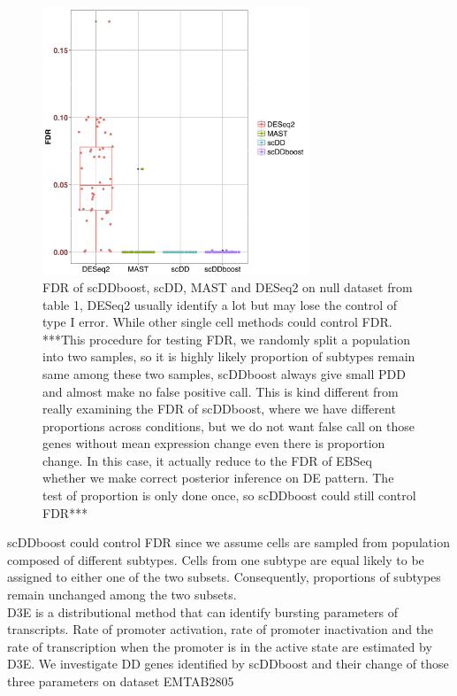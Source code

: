 \documentclass[11pt]{amsart}
\begin{document}
\begin{figure}[h]
\includegraphics[width = 8cm]{FDR.png}
 \caption{FDR of scDDboost, scDD, MAST and DESeq2 on null dataset from table 1, DESeq2 usually identify a lot but may lose the control of type I error. While other single cell methods could control FDR. ***This procedure for testing FDR,  we randomly split a population into two samples, so it is highly likely proportion of subtypes remain same among these two samples, scDDboost always give small PDD and almost make no false positive call. This is kind different from really examining the FDR of scDDboost, where we have different proportions across conditions, but we do not want false call on those genes without mean expression change even there is proportion change. In this case, it actually reduce to the FDR of EBSeq whether we make correct posterior inference on DE pattern. The test of proportion is only done once, so scDDboost could still control FDR*** }
  \label{fig:7}
\end{figure}
scDDboost could control FDR since we assume cells are sampled from population composed of different subtypes. Cells from one subtype are equal likely to be assigned to either one of the two subsets. Consequently, proportions of subtypes remain unchanged among the two subsets.\\
D3E\cite{ref:d3e} is a distributional method that can identify bursting parameters of transcripts. Rate of promoter activation, rate of promoter inactivation and the rate of transcription when the promoter is in the active state are estimated by D3E.  We investigate DD genes identified by scDDboost and their change of those three parameters on dataset EMTAB2805\\
\end{document}
